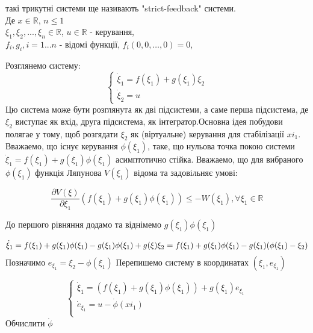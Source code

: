\documentclass{article}
\begin{document}
такі трикутні системи ще називають "strict-feedback" системи.\\
Де $x \in \mathbb{R}$, $n \leq 1$\\
$\xi_1, \xi_2, ... ,\xi_n \in \mathbb{R}$, $u \in \mathbb{R}$ - керування,\\ 
$f_i, g_i, i = 1 ... n $ -  відомі функції, $f_i(0,0, \dots, 0) = 0$, 
\pagebreak







Розглянемо систему:
\begin{equation}
	\begin{cases}
		\dot \xi_1 = f(\xi_1) + g(\xi_1)\xi_2 \\
		\dot\xi_2 = u
	\end{cases}
\end{equation}
Цю система може бути розглянута як дві підсистеми, а саме перша підсистема, де $\xi_2$ виступає як вхід, друга
підсистема, як інтегратор.Основна ідея побудови полягае у тому, щоб розгядати $\xi_2$ як (віртуальне) керування для
стабілізації $xi_1$. Вважаемо, що існує керування $\phi(\xi_1)$, таке, що нульова точка покою
системи $\dot \xi_1 = f(\xi_1) + g(\xi_1)\phi(\xi_1)$
асимптотично стійка.
Вважаемо, що для вибраного $\phi(\xi_1)$ функція Ляпунова $V(\xi_1)$  відома та задовільняє умові:

\begin{equation}
    \frac{\partial V(\xi)}{\partial \xi_1}(f(\xi_1)+g(\xi_1)\phi(\xi_1)) \leq
    -W(\xi_1), \forall \xi_1 \in \mathbb{R}
\end{equation}

До першого рівняння додамо та віднімемо $g(\xi_1)\phi(\xi_1)$

\begin{equation}
\dot\xi_1 = f(\xi_1)+g(\xi_1)\phi(\xi_1)-g(\xi_1)\phi(\xi_1)+g(\xi)\xi_2 =\\
f(\xi_1)+g(\xi_1)\phi(\xi_1)-g(\xi_1)(\phi(\xi_1)-\xi_2)
\end{equation}
Позначимо $e_{\xi_1} = \xi_2-\phi(\xi_1)$
Перепишемо систему в координатах $(\xi_1, e_{\xi_1})$

\begin{equation}
    \begin{cases}
    \dot \xi_1 = (f(\xi_1)+g(\xi_1)\phi(\xi_1))+g(\xi_1)e_{\xi_1}\\
    \dot e_{\xi_1} = u-\dot \phi(xi_1)\\  
    \end{cases}
\end{equation}
Обчислити $\dot\phi$ 
\end{document}
